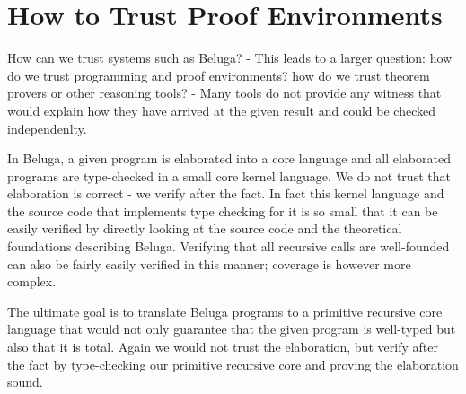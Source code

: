 \section{How to Trust Proof Environments}
How can we trust systems such as Beluga? - This leads to a larger question: how do we trust programming and proof environments? how do we trust theorem provers or other reasoning tools? - Many tools do not provide any witness that would explain how they have arrived at the given result and could be checked independenlty. 

In Beluga, a given program is elaborated into a core language and all elaborated programs are type-checked in a small core kernel language. We do not trust that elaboration is correct - we verify after the fact. In fact this kernel language and the source code that implements type checking for it is so small that it can be easily verified by directly looking at the source code and the theoretical foundations describing Beluga. Verifying that all recursive calls are well-founded can also be fairly easily verified in this manner; coverage is however more complex. 

The ultimate goal is to translate Beluga programs to a primitive recursive core language that would not only guarantee that the given program is well-typed but also that it is total. Again we would not trust the elaboration, but verify after the fact by type-checking our primitive recursive core and proving the elaboration sound.

